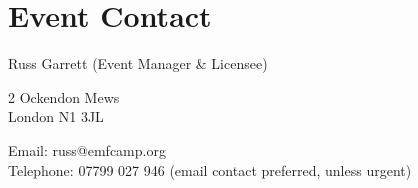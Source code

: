 \section{Event Contact}

Russ Garrett (Event Manager \& Licensee)

2 Ockendon Mews \\
London N1 3JL

Email: russ@emfcamp.org \\
Telephone: 07799 027 946 (email contact preferred, unless urgent)

